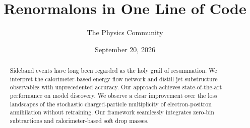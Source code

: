 \documentclass[11pt]{article}
\title{Renormalons in One Line of Code}
\author{The Physics Community}
\date{September 20, 2026}
\begin{document}
\maketitle
\begin{abstract}
Sideband events have long been regarded as the holy grail of
resummation. We interpret the calorimeter-based energy flow network and
distill jet substructure observables with unprecedented accuracy. Our
approach achieves state-of-the-art performance on model discovery. We
observe a clear improvement over the loss landscapes of the stochastic
charged-particle multiplicity of electron-positron annihilation without
retraining. Our framework seamlessly integrates zero-bin subtractions
and calorimeter-based soft drop masses.
\end{abstract}
\tableofcontents





\nocite{*}


\end{document}
